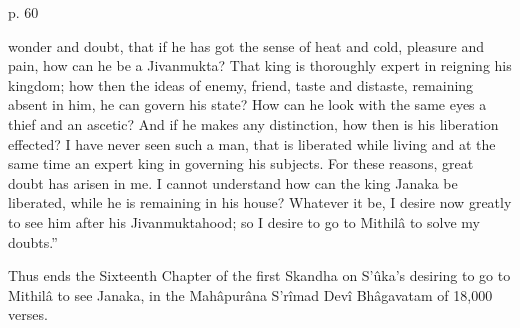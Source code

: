  

p. 60

 

wonder and doubt, that if he has got the sense of heat and cold, pleasure and pain, how can he be a Jivanmukta? That king is thoroughly expert in reigning his kingdom; how then the ideas of enemy, friend, taste and distaste, remaining absent in him, he can govern his state? How can he look with the same eyes a thief and an ascetic? And if he makes any distinction, how then is his liberation effected? I have never seen such a man, that is liberated while living and at the same time an expert king in governing his subjects. For these reasons, great doubt has arisen in me. I cannot understand how can the king Janaka be liberated, while he is remaining in his house? Whatever it be, I desire now greatly to see him after his Jivanmuktahood; so I desire to go to Mithilâ to solve my doubts.”

 

Thus ends the Sixteenth Chapter of the first Skandha on S’ûka's desiring to go to Mithilâ to see Janaka, in the Mahâpurâna S’rîmad Devî Bhâgavatam of 18,000 verses.